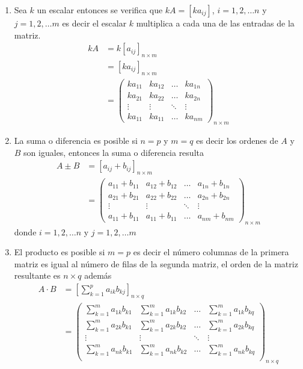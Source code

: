 \documentclass[
  11pt,
]{krantz}
\theoremstyle{definition}
\theoremstyle{definition}
\theoremstyle{definition}
\theoremstyle{definition}
\theoremstyle{remark}
\begin{document}
\begin{enumerate}
\def\labelenumi{\arabic{enumi}.}
\item
  Sea \(k\) un escalar entonces se verifica que \(kA=[ka_{ij}]\), \(i=1,2,\ldots n\) y \(j=1,2,\ldots m\) es decir el escalar \(k\) multiplica a cada una de las entradas de la matriz.
  \begin{align*}
  kA&=k[a_{ij}]_{n\times m}\\
  &=[ka_{ij}]_{n\times m}\\
  &=\begin{pmatrix}
  ka_{11}&ka_{12}&\ldots&ka_{1n}\\
  ka_{21}&ka_{22}&\ldots&ka_{2n}\\
  \vdots & \vdots & \ddots &\vdots \\
  ka_{11}&ka_{11}&\ldots&ka_{nm}
  \end{pmatrix}_{n\times m}
  \end{align*}
\item
  La suma o diferencia es posible si \(n=p\) y \(m=q\) es decir los ordenes de \(A\) y \(B\) son iguales, entonces la suma o diferencia resulta \begin{align*}
  A\pm B&=[a_{ij}+b_{ij}]_{n\times m}\\
  &=\begin{pmatrix}
  a_{11} + b_{11}&a_{12} + b_{12}&\ldots&a_{1n} + b_{1n}\\
  a_{21} + b_{21}&a_{22} + b_{22}&\ldots&a_{2n} + b_{2n}\\
  \vdots & \vdots & \ddots &\vdots \\
  a_{11} + b_{11}&a_{11} + b_{11}&\ldots&a_{nm} + b_{nm}
  \end{pmatrix}_{n\times m}
  \end{align*} donde \(i=1,2,\ldots n\) y \(j=1,2,\ldots m\)
\item
  El producto es posible si \(m=p\) es decir el número columnas de la primera matriz es igual al número de filas de la segunda matriz, el orden de la matriz resultante es \(n\times q\) además
  \begin{align*}
  A\cdot B&=\left[\sum_{k=1}^pa_{ik}b_{kj}\right]_{n\times q}\\
  &=\begin{pmatrix}
  \sum_{k=1}^ma_{1k}b_{k1}&\sum_{k=1}^ma_{1k}b_{k2}&\ldots&\sum_{k=1}^ma_{1k}b_{kq}\\
  \sum_{k=1}^ma_{2k}b_{k1}&\sum_{k=1}^ma_{2k}b_{k2}&\ldots&\sum_{k=1}^ma_{2k}b_{kq}\\
  \vdots & \vdots & \ddots &\vdots \\
  \sum_{k=1}^ma_{nk}b_{k1}&\sum_{k=1}^ma_{nk}b_{k2}&\ldots&\sum_{k=1}^ma_{nk}b_{kq}\\
  \end{pmatrix}_{n\times q}
  \end{align*}
\end{enumerate}
\end{document}
